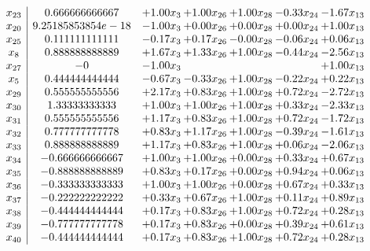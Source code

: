 \documentclass[8pt]{article}
\begin{document}
\[\begin{array}{c| c c@{\hskip 2pt} c@{\hskip 2pt} c@{\hskip 2pt} c@{\hskip 2pt} c@{\hskip 2pt} }
 x_{23}   &  0.666666666667 & +  1.00 x_{3} & +  1.00 x_{26} & +  1.00 x_{28} & -0.33 x_{24} & -1.67 x_{13}\\
 x_{20}   &  9.25185853854e-18 & -1.00 x_{3} & +  0.00 x_{26} & +  0.00 x_{28} & +  0.00 x_{24} & +  1.00 x_{13}\\
 x_{25}   &  0.111111111111 & -0.17 x_{3} & +  0.17 x_{26} & -0.00 x_{28} & -0.06 x_{24} & +  0.06 x_{13}\\
 x_{8}   &  0.888888888889 & +  1.67 x_{3} & +  1.33 x_{26} & +  1.00 x_{28} & -0.44 x_{24} & -2.56 x_{13}\\
 x_{27}   &  -0 & -1.00 x_{3} &    &    &   & +  1.00 x_{13}\\
 x_{5}   &  0.444444444444 & -0.67 x_{3} & -0.33 x_{26} & +  1.00 x_{28} & -0.22 x_{24} & +  0.22 x_{13}\\
 x_{29}   &  0.555555555556 & +  2.17 x_{3} & +  0.83 x_{26} & +  1.00 x_{28} & +  0.72 x_{24} & -2.72 x_{13}\\
 x_{30}   &  1.33333333333 & +  1.00 x_{3} & +  1.00 x_{26} & +  1.00 x_{28} & +  0.33 x_{24} & -2.33 x_{13}\\
 x_{31}   &  0.555555555556 & +  1.17 x_{3} & +  0.83 x_{26} & +  1.00 x_{28} & +  0.72 x_{24} & -1.72 x_{13}\\
 x_{32}   &  0.777777777778 & +  0.83 x_{3} & +  1.17 x_{26} & +  1.00 x_{28} & -0.39 x_{24} & -1.61 x_{13}\\
 x_{33}   &  0.888888888889 & +  1.17 x_{3} & +  0.83 x_{26} & +  1.00 x_{28} & +  0.06 x_{24} & -2.06 x_{13}\\
 x_{34}   &  -0.666666666667 & +  1.00 x_{3} & +  1.00 x_{26} & +  0.00 x_{28} & +  0.33 x_{24} & +  0.67 x_{13}\\
 x_{35}   &  -0.888888888889 & +  0.83 x_{3} & +  0.17 x_{26} & +  0.00 x_{28} & +  0.94 x_{24} & +  0.06 x_{13}\\
 x_{36}   &  -0.333333333333 & +  1.00 x_{3} & +  1.00 x_{26} & +  0.00 x_{28} & +  0.67 x_{24} & +  0.33 x_{13}\\
 x_{37}   &  -0.222222222222 & +  0.33 x_{3} & +  0.67 x_{26} & +  1.00 x_{28} & +  0.11 x_{24} & +  0.89 x_{13}\\
 x_{38}   &  -0.444444444444 & +  0.17 x_{3} & +  0.83 x_{26} & +  1.00 x_{28} & +  0.72 x_{24} & +  0.28 x_{13}\\
 x_{39}   &  -0.777777777778 & +  0.17 x_{3} & +  0.83 x_{26} & +  0.00 x_{28} & +  0.39 x_{24} & +  0.61 x_{13}\\
 x_{40}   &  -0.444444444444 & +  0.17 x_{3} & +  0.83 x_{26} & +  1.00 x_{28} & +  0.72 x_{24} & +  0.28 x_{13}\\

\end{array}\]
\end{document}
